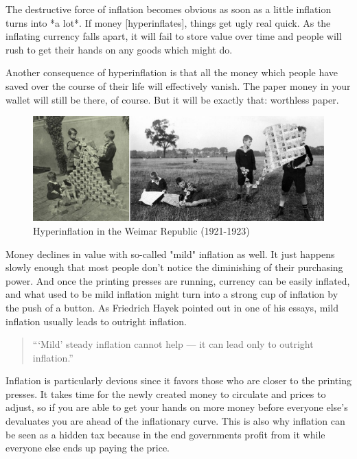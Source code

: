 The destructive force of inflation becomes obvious as soon as a little
inflation turns into *a lot*. If money [hyperinflates], things get ugly
real quick. As the inflating currency falls apart, it will fail to store
value over time and people will rush to get their hands on any goods
which might do.

Another consequence of hyperinflation is that all the money which people
have saved over the course of their life will effectively vanish. The
paper money in your wallet will still be there, of course. But it will
be exactly that: worthless paper.

\begin{figure}
  \includegraphics{assets/images/children-playing-with-money.png}
  \caption{Hyperinflation in the Weimar Republic (1921-1923)}
  \label{fig:children-playing-with-money}
\end{figure}

Money declines in value with so-called "mild" inflation as well. It
just happens slowly enough that most people don't notice the diminishing
of their purchasing power. And once the printing presses are running,
currency can be easily inflated, and what used to be mild inflation
might turn into a strong cup of inflation by the push of a button. As
Friedrich Hayek pointed out in one of his essays, mild inflation usually
leads to outright inflation.

\begin{quotation}
```Mild' steady inflation cannot help --- it can lead only to outright
inflation.''
\end{quotation}

Inflation is particularly devious since it favors those who are closer
to the printing presses. It takes time for the newly created money to
circulate and prices to adjust, so if you are able to get your hands on
more money before everyone else's devaluates you are ahead of the
inflationary curve. This is also why inflation can be seen as a hidden
tax because in the end governments profit from it while everyone else
ends up paying the price.

